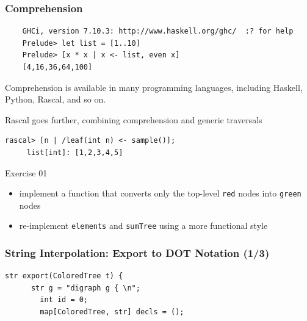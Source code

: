\documentclass{beamer}
\begin{document}
\begin{frame}[fragile]
  \frametitle{Comprehension}

  \begin{small}
  \begin{verbatim}
    GHCi, version 7.10.3: http://www.haskell.org/ghc/  :? for help
    Prelude> let list = [1..10]
    Prelude> [x * x | x <- list, even x]
    [4,16,36,64,100]    
  \end{verbatim}\end{small} \pause
  
  Comprehension is available in many programming languages\pause,
  including Haskell, Python, Rascal, and so on. \pause 

  \begin{block}{Rascal goes further, combining comprehension and generic traversals}
   \begin{lstlisting}[language=Rascal]
     rascal> [n | /leaf(int n) <- sample()];
     list[int]: [1,2,3,4,5]
   \end{lstlisting}
  \end{block}
  
\end{frame}

\begin{frame}
  \begin{block}{Exercise 01}
    \begin{itemize}
      \item implement a function that converts only the top-level \texttt{red} nodes into \texttt{green} nodes
        \item re-implement \texttt{elements} and \texttt{sumTree} using a more {\color{blue}functional style}   
    \end{itemize}
  \end{block}  
\end{frame}
\begin{frame}[fragile]
  \frametitle{String Interpolation: Export to DOT Notation (1/3)}

    \begin{lstlisting}[language=Rascal]
    str export(ColoredTree t) {
      str g = "digraph g { \n";
        int id = 0;
        map[ColoredTree, str] decls = ();
\end{lstlisting}

\end{frame}
\end{document}
